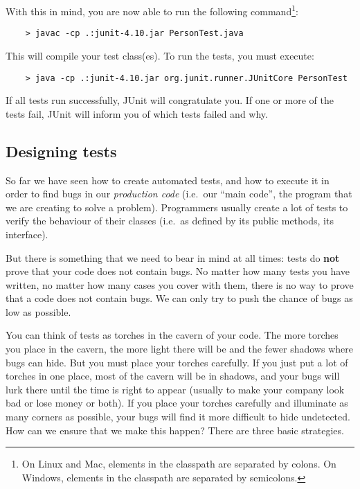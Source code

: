 With this in mind, you are now able to run the following
command\footnote{On Linux and Mac, elements in the classpath are
  separated by colons. On Windows, elements in the classpath are
  separated by semicolons.}: 

\begin{verbatim}
    > javac -cp .:junit-4.10.jar PersonTest.java
\end{verbatim}

This will compile your test class(es). To run the tests, you must
execute: 

\begin{verbatim}
    > java -cp .:junit-4.10.jar org.junit.runner.JUnitCore PersonTest
\end{verbatim}

If all tests run successfully, JUnit will congratulate you. If one or
more of the tests fail, JUnit will inform you of which tests failed
and why. 

\subsection{Designing tests}
\label{sec:designing-tests}

So far we have seen how to create automated tests, and how to execute
it in order to find bugs in our \emph{production code} (i.e.~our
``main code'', the program that we are creating to solve a
problem). Programmers usually create a lot of tests to verify the
behaviour of their classes (i.e.~as defined by its public methods, its
interface). 

But there is something that we need to bear in mind at all
times: tests do \textbf{not} prove that your code does not contain
bugs. No matter how many tests you have written, no matter how many
cases you cover with them, there is no way to prove that a code does
not contain bugs. We can only try to push the chance of bugs as low as
possible. 

You can think of tests as torches in the cavern of your code. The more
torches you place in the cavern, the more light there will be and the
fewer shadows where bugs can hide. But you must place your
torches carefully. If you just put a lot of torches in one place, most
of the cavern will be in shadows, and your bugs will lurk there until
the time is right to appear (usually to make your company look bad or
lose money or both). If you place your torches carefully and
illuminate as many corners as possible, your bugs will find it more
difficult to hide undetected. How can we ensure that we make this
happen? There are three basic strategies.

